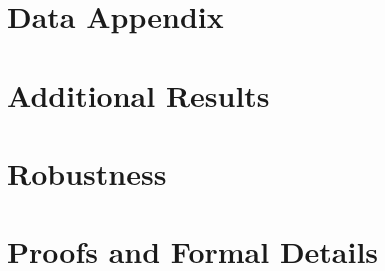 \section{Data Appendix}\label{app:data}


\section{Additional Results}\label{app:additional-results}


\section{Robustness}\label{app:robustness}


\section{Proofs and Formal Details}\label{app:proofs}


